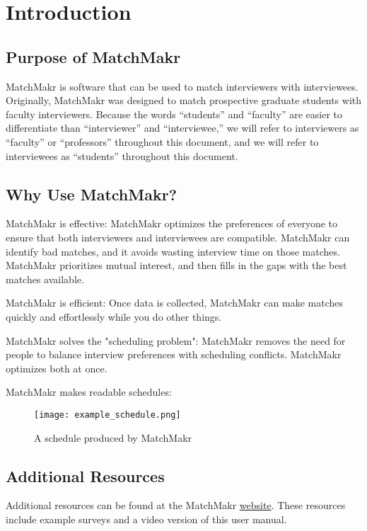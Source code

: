 

\chapter{Introduction}

\section{Purpose of MatchMakr}
MatchMakr is software that can be used to match interviewers with interviewees.  Originally, MatchMakr was designed to match prospective graduate students with faculty interviewers.  Because the words ``students'' and ``faculty'' are easier to differentiate than ``interviewer'' and ``interviewee,'' we will refer to interviewers as ``faculty'' or ``professors'' throughout this document, and we will refer to interviewees as ``students'' throughout this document.

\section{Why Use MatchMakr?}
\par
MatchMakr is effective: 
MatchMakr optimizes the preferences of everyone to ensure that both interviewers and interviewees are compatible.  MatchMakr can identify bad matches, and it avoids wasting interview time on those matches.  MatchMakr prioritizes mutual interest, and then fills in the gaps with the best matches available.

\par
MatchMakr is efficient:
Once data is collected, MatchMakr can make matches quickly and effortlessly while you do other things.

\par
MatchMakr solves the "scheduling problem":
MatchMakr removes the need for people to balance interview preferences with scheduling conflicts.  MatchMakr optimizes both at once.


MatchMakr makes readable schedules:
\begin{figure}[!h]
	\centering
	\texttt{[image: example\_schedule.png]}
	\caption{\label{fig:example_schedule} A schedule produced by MatchMakr}
\end{figure}

\section{Additional Resources}
Additional resources can be found at the MatchMakr \href{https://sites.google.com/case.edu/matchmakr/home}{website}.  These resources include example surveys and a video version of this user manual.